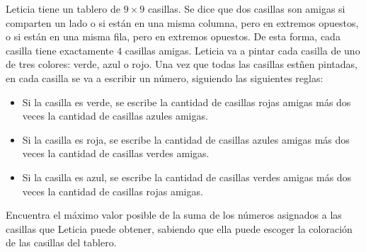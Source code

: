 Leticia tiene un tablero de $9\times 9$ casillas. Se dice que dos casillas son amigas si comparten un lado o si están en una misma columna, pero en extremos opuestos, o si están en una misma fila, pero en extremos opuestos. De esta forma, cada casilla tiene exactamente $4$ casillas amigas. Leticia va a pintar cada casilla de uno de tres colores: verde, azul o rojo. Una vez que todas las casillas estñen pintadas, en cada casilla se va a escribir un número, siguiendo las siguientes reglas:
 \begin{itemize} 
 \item  Si la casilla es verde, se escribe la cantidad de casillas rojas amigas más dos veces la cantidad de casillas azules amigas.
 \item  Si la casilla es roja, se escribe la cantidad de casillas azules amigas más dos veces la cantidad de casillas verdes amigas.
 \item  Si la casilla es azul, se escribe la cantidad de casillas verdes amigas más dos veces la cantidad de casillas rojas amigas.
 \end{itemize} 
Encuentra el máximo valor posible de la suma de los números asignados a las casillas que Leticia puede obtener, sabiendo que ella puede escoger la coloración de las casillas del tablero.
